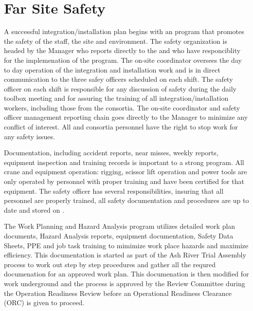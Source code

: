 \section{Far Site Safety}
\label{sec:far_site_safety}

A successful integration/installation plan begins with an 
program that promotes the safety of the staff, the  site
and environment. The safety organization is headed by the
  Manager who reports directly to
the  and  who have responciblity for the
implemenation of the   program.
The on-site   coordinator oversees the day to
day operation of the integration and installation work and is in
direct communication to the three safey officers scheduled on each
shift.  The safety officer on each shift is responsible for any
discussion of safety during the daily toolbox meeting and for assuring
the training of all integration/installation workers, including those
from the consortia.  The on-site   coordinator
and safety officer management reporting chain goes directly to the
  Manager to minimize any conflict
of interest. All  and consortia personnel have the right to
stop work for any safety issues.

Documentation, including accident reports, near misses, weekly
reports, equipment inspection and training records is important to a
strong  program. All crane and equipment operation:
rigging, scissor lift operation and power tools are only operated by
personnel with proper training and have been certified for that
equipment. The safety officer has several responsibilities, insuring
that all personnel are properly trained, all safety documentation and
procedures are up to date and stored on .

The Work Planning and Hazard Analysis program utilizes detailed work
plan documents, Hazard Analysis reports, equipment documentation,
Safety Data Sheets, PPE and job task training to mimimize work place
hazards and maximize efficiency.  This documentation is started as
part of the Ash River Trial Assembly process to work out step by step
procedures and gather all the requred documenation for an approved
work plan.  This documenation is then modified for work underground
and the process is approved by the   Review
Committee during the Operation Readiness Review before an Operational
Readiness Clearance (ORC) is given to proceed.


